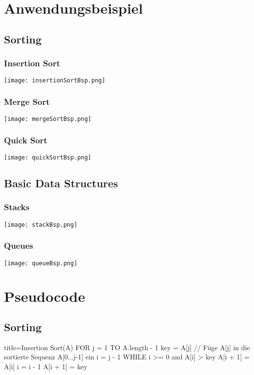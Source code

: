 \pagebreak

\section*{Anwendungsbeispiel}

\subsection*{Sorting}

\subsubsection*{Insertion Sort}
\centerline{\texttt{[image: insertionSortBsp.png]}}

\subsubsection*{Merge Sort}
\centerline{\texttt{[image: mergeSortBsp.png]}}

\subsubsection*{Quick Sort}
\centerline{\texttt{[image: quickSortBsp.png]}}

\subsection*{Basic Data Structures}

\subsubsection*{Stacks}
\centerline{\texttt{[image: stackBsp.png]}}

\subsubsection*{Queues}
\centerline{\texttt{[image: queueBsp.png]}}

\section*{Pseudocode}
\subsection*{Sorting}
    \begin{ccode}[autogobble]{title=Insertion Sort(A)}  
        FOR j = 1 TO A.length - 1
          key = A[j]
          // Füge A[j] in die sortierte Sequenz A[0...j-1] ein
          i = j - 1
          WHILE i >= 0 and A[i] > key
              A[i + 1] = A[i]
              i = i - 1
          A[i + 1] = key
    \end{ccode}

